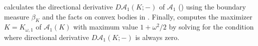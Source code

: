  calculates the directional derivative \(D\mathcal{A}_1(K; -)\) of \(\mathcal{A}_1\) () using the boundary measure \(\beta_K\) and the facts on convex bodies in . Finally,  computes the maximizer \(K = K_{\omega, 1}\) of \(\mathcal{A}_1(K)\) with maximum value \(1 + \omega^2/2\) by solving for the condition where directional derivative \(D\mathcal{A}_1(K; -)\) is always zero.